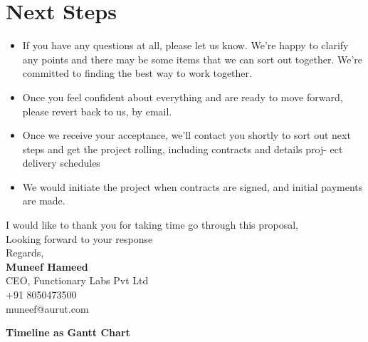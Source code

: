 \documentclass[a4paper,10pt]{article}
\begin{document}
		\section{Next Steps}
		
		\begin{itemize}
			\item If you have any questions at all, please let us know. We’re happy to clarify any points and there may be some items that we can sort out together. We’re committed to finding the best way to work together.
			\item Once you feel confident about everything and are ready to move forward, please revert back to us, by email.
			\item Once we receive your acceptance, we’ll contact you shortly to sort out next steps and get the project rolling, including contracts and details proj- ect delivery schedules
			\item We would initiate the project when contracts are signed, and initial payments are made.
		\end{itemize} 
		
		
		\vspace{15mm} %
		
		\noindent
		I would like to thank you for taking time go through this proposal, \\
		Looking forward to your response \\
		
		
		\noindent
		Regards, \\
		
		\vspace{4mm} %
		\noindent
		\textbf{Muneef Hameed }\\
		\noindent
		CEO, Functionary Labs Pvt Ltd \\
				\noindent
		+91 8050473500 \\
		muneef@aurut.com
		\vfill
		\vfill
		
		\newpage
		
		\textbf{Timeline as Gantt Chart}\\
		
				\vspace{2mm} %
		\begin{ganttchart}[vgrid={draw=none, dotted}, hgrid]{1}{20}
			 \\
			 \\
			 \\
			 \\
			 \\
			 \\
		\end{ganttchart}
		\vfill
		
	
\end{document}
